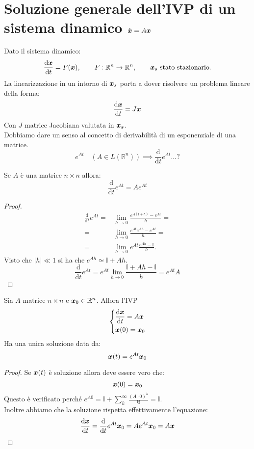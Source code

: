 \section{Soluzione generale dell'IVP di un sistema dinamico $\dot{\boldsymbol{x}} = A \boldsymbol{x}$ }%
Dato il sistema dinamico:
\[
    \frac{\text{d} \boldsymbol{x}}{\text{d} t} = F(\boldsymbol{x}),  \qquad F: \mathbb{R}^n\to \mathbb{R}^n, \qquad \boldsymbol{x}_s \text{ stato stazionario.}
\] 
La linearizzazione in un intorno di $\boldsymbol{x}_s$  porta a dover risolvere un problema lineare della forma:
\[
    \frac{\text{d} \boldsymbol{x}}{\text{d} t} = J\boldsymbol{x}  
\] 
Con $J$ matrice Jacobiana valutata in $\boldsymbol{\boldsymbol{x}_s}$.\\
Dobbiamo dare un senso al concetto di derivabilità di un esponenziale di una matrice. 
\[
    e^{At} \quad (A \in L(\mathbb{R}^n)) \implies  \frac{\text{d} }{\text{d} t} e^{At}\ldots ?
\] 
\begin{thm}
    Se $A$  è una matrice $n\times n$  allora:
    \[
        \frac{\text{d}}{\text{d} t} e^{At}  = Ae^{At}
    \] 
\end{thm}
\noindent
\begin{proof}
    \[\begin{aligned}
	\frac{\text{d} }{\text{d} t} e^{At} =& \lim_{h \to 0} \frac{e^{A(t+h)}-e^{At}}{h} =\\
	                       =&\lim_{h \to 0} \frac{e^{At}e^{Ah}-e^{At}}{h} = \\
			       = & \lim_{h \to 0} e^{At}\frac{e^{Ah}-\mathbb{I}}{h}
    .\end{aligned}\]
    Visto che $\left|h\right|\ll 1$  si ha che $e^{Ah}\simeq \mathbb{I}+ Ah$. 
    \[
        \frac{\text{d} }{\text{d} t} e^{At} = e^{At}\lim_{h \to 0} \frac{\mathbb{I} + Ah - \mathbb{I}}{h} = e^{At}A
    \] 
\end{proof}
\noindent
\begin{thm}
    Sia $A$ matrice $n\times n$ e $\boldsymbol{x}_0 \in \mathbb{R}^n$. Allora l'IVP 
    \[\begin{dcases}
        \frac{\text{d} \boldsymbol{x}}{\text{d} t} = A\boldsymbol{x}\\
	\boldsymbol{x}(0)=\boldsymbol{x}_0
    \end{dcases}\] 
    Ha una unica soluzione data da:
    \[
	\boldsymbol{x} (t) = e^{At}\boldsymbol{x}_0
    \] 
\end{thm}
\noindent
\begin{proof}
    Se $\boldsymbol{x} (t)$ è soluzione allora deve essere vero che:
    \[
	\boldsymbol{x} (0)=\boldsymbol{x}_0
    \] 
    Questo è verificato perché $e^{A 0}= \mathbb{I} + \sum_{k}^{\infty} \frac{(A\cdot 0)^k}{k!}= \mathbb{I}$.\\
    Inoltre abbiamo che la soluzione rispetta effettivamente l'equazione:
    \[
        \frac{\text{d} \boldsymbol{x}}{\text{d} t} = \frac{\text{d} }{\text{d} t} e^{At}\boldsymbol{x}_0 = Ae^{At}\boldsymbol{x}_0 = A \boldsymbol{x}
    \] 
\end{proof}
